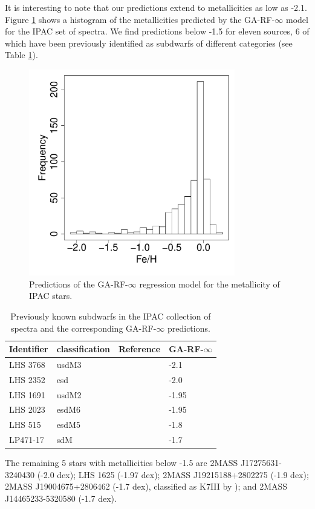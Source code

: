 It is interesting to note that our predictions extend to metallicities
as low as -2.1. Figure \ref{fig:ipac-hist-mets} shows a histogram of
the metallicities predicted by the GA-RF-$\infty$ model for the IPAC
set of spectra. We find predictions below -1.5 for eleven sources, 6
of which have been previously identified as subdwarfs of different
categories (see Table \ref{tab:known-sds}).

\begin{figure}
	\begin{center}
		\includegraphics[width=9cm]{figs/ipac-figs/ipac-M-hist.pdf}

	\end{center}
        
        \caption{\label{fig:ipac-hist-mets}
Predictions of the GA-RF-$\infty$ regression model
        for the metallicity of IPAC stars.}

\end{figure}


\begin{table}\centering
	\begin{tabular}{@{}llll@{}}
		\hline
		Identifier & classification & Reference & GA-RF-$\infty$\\
		\hline
		LHS 3768 & usdM3 & \cite{1995AJ....109..797K}  & -2.1 \\
		LHS 2352 & esd   & \cite{1995AJ....109..797K}  & -2.0 \\
		LHS 1691 & usdM2 & \cite{0004-637X-669-2-1235} & -1.95\\
		LHS 2023 & esdM6 & \cite{0004-637X-672-2-1153} & -1.95\\
		LHS 515  & esdM5 & \cite{1538-3873-117-833-676}& -1.8\\
		LP471-17 & sdM   & \cite{1995AJ....109..797K}  & -1.7\\
		\hline
	\end{tabular}
        
	\caption{Previously known subdwarfs in the IPAC collection of
	spectra and the corresponding GA-RF-$\infty$ predictions.}

\label{tab:known-sds} 
\end{table}

The remaining 5 stars with metallicities below -1.5 are 2MASS
J17275631-3240430 (-2.0 dex); LHS 1625 (-1.97 dex); 2MASS
J19215188+2802275 (-1.9 dex); 2MASS J19004675+2806462 (-1.7 dex),
classified as K7III by \cite{1994ApJS...94..749K}); and 2MASS
J14465233-5320580 (-1.7 dex).

